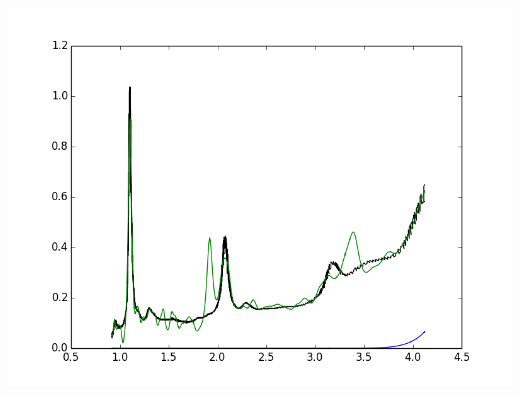 \documentclass{article}
\begin{document}
\includegraphics{"(8,4) ATPE DNA Paper.png"}
\end{document}
